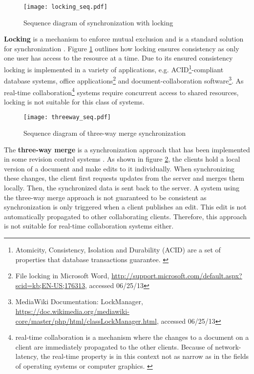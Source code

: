 \begin{figure}[!h]
\begin{center}
\texttt{[image: locking\_seq.pdf]}
\caption{Sequence diagram of synchronization with locking}
\label{fig:locking}
\end{center}
\end{figure}

\textbf{Locking} is a mechanism to enforce mutual exclusion and is a standard solution for synchronization \cite{Dijkstra_1965}. Figure \ref{fig:locking} outlines how locking ensures consistency as only one user has access to the resource at a time. Due to its ensured consistency locking is implemented in a variety of applications, e.g. ACID\footnote{Atomicity, Consistency, Isolation and Durability (ACID) are a set of properties that database transactions guarantee. \cite{Gray_1981}}-compliant database systems, office applications\footnote{File locking in Microsoft Word, \url{http://support.microsoft.com/default.aspx?scid=kb;EN-US;176313}, accessed 06/25/13} and document-collaboration software\footnote{MediaWiki Documentation: LockManager, \url{https://doc.wikimedia.org/mediawiki-core/master/php/html/classLockManager.html}, accessed 06/25/13}. As real-time collaboration\footnote{real-time collaboration is a mechanism where the changes to a document on a client are immediately propagated to the other clients. Because of network-latency, the real-time property is in this context not as narrow as in the fields of operating systems or computer graphics. \cite{Sun_2002}} systems require concurrent access to shared resources, locking is not suitable for this class of systems.

\begin{figure}[!h]
\begin{center}
\texttt{[image: threeway\_seq.pdf]}
\caption{Sequence diagram of three-way merge synchronization}
\label{fig:threeway}
\end{center}
\end{figure}

The \textbf{three-way merge} is a synchronization approach that has been implemented in some revision control systems \cite{Pilato_2008}. As shown in figure \ref{fig:threeway}, the clients hold a local version of a document and make edits to it individually. When synchronizing these changes, the client first requests updates from the server and merges them locally. Then, the synchronized data is sent back to the server. A system using the three-way merge approach is not guaranteed to be consistent as synchronization is only triggered when a client publishes an edit. This edit is not automatically propagated to other collaborating clients. Therefore, this approach is not suitable for real-time collaboration systems either.

